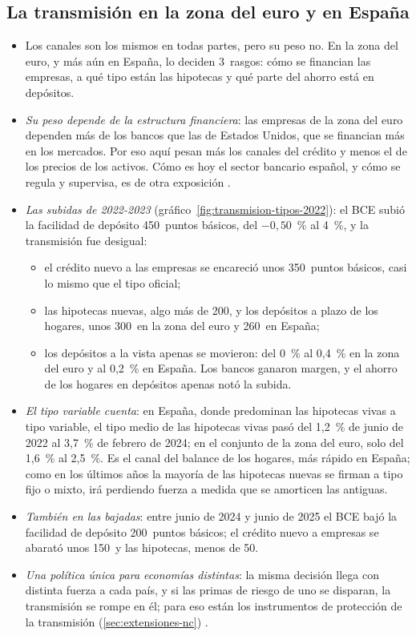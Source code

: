 \documentclass[11pt]{article}
\begin{document}
\subsection{La transmisión en la zona del euro y en España}\label{sec:zona-euro}

\begin{itemize}
\item Los canales son los mismos en todas partes, pero su peso no. En la zona del euro, y más aún en España, lo deciden 3~rasgos: cómo se financian las empresas, a qué tipo están las hipotecas y qué parte del ahorro está en depósitos.
\item \emph{Su peso depende de la estructura financiera}: las empresas de la zona del euro dependen más de los bancos que las de Estados Unidos, que se financian más en los mercados\nocite{DeFioreUhlig2011Bank}. Por eso aquí pesan más los canales del crédito y menos el de los precios de los activos. Cómo es hoy el sector bancario español, y cómo se regula y supervisa, es de otra exposición .
\item \emph{Las subidas de 2022-2023} (gráfico~\ref{fig:transmision-tipos-2022}): el BCE subió la facilidad de depósito 450~puntos básicos, del $-0{,}50$~\% al 4~\%, y la transmisión fue desigual\nocite{BCE2026MIR,BdE2026BE19}:
  \begin{itemize}
  \item el crédito nuevo a las empresas se encareció unos 350~puntos básicos, casi lo mismo que el tipo oficial\nocite{BCE2026MIR};
  \item las hipotecas nuevas, algo más de 200, y los depósitos a plazo de los hogares, unos 300~en la zona del euro y 260~en España;
  \item los depósitos a la vista apenas se movieron: del 0~\% al 0,4~\% en la zona del euro y al 0,2~\% en España. Los bancos ganaron margen, y el ahorro de los hogares en depósitos apenas notó la subida.
  \end{itemize}
\item \emph{El tipo variable cuenta}: en España, donde predominan las hipotecas vivas a tipo variable, el tipo medio de las hipotecas vivas pasó del 1,2~\% de junio de 2022 al 3,7~\% de febrero de 2024; en el conjunto de la zona del euro, solo del 1,6~\% al 2,5~\%\nocite{BCE2026MIR}. Es el canal del balance de los hogares, más rápido en España; como en los últimos años la mayoría de las hipotecas nuevas se firman a tipo fijo o mixto, irá perdiendo fuerza a medida que se amorticen las antiguas.
\item \emph{También en las bajadas}: entre junio de 2024 y junio de 2025 el BCE bajó la facilidad de depósito 200~puntos básicos; el crédito nuevo a empresas se abarató unos 150~y las hipotecas, menos de 50\nocite{BCE2026MIR}.
\item \emph{Una política única para economías distintas}: la misma decisión llega con distinta fuerza a cada país, y si las primas de riesgo de uno se disparan, la transmisión se rompe en él; para eso están los instrumentos de protección de la transmisión (\ref{sec:extensiones-nc}) .
\end{itemize}
\end{document}
